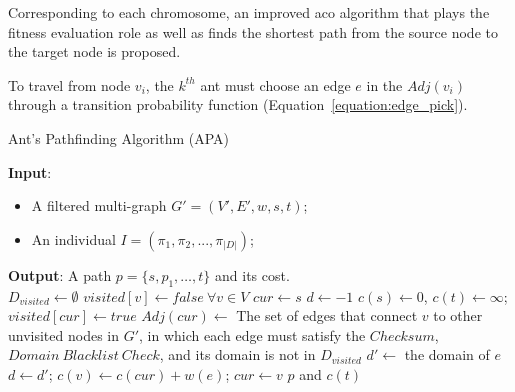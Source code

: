 Corresponding to each chromosome, an improved \gls{aco} algorithm that plays the fitness evaluation role as well as finds the shortest path from the source node to the target node is proposed. 

To travel from node $v_i$, the $k^{th}$ ant must choose an edge $e$ in the $Adj(v_i)$ through a transition probability function (Equation~\ref{equation:edge_pick}).

\begin{algorithm}
	\caption{Ant's Pathfinding Algorithm (APA)}
	\label{alg:apa}
	\textbf{Input}:	
	\begin{itemize}
		\item A filtered multi-graph $G' = (V', E', w, s, t)$;
		\item An individual $I = (\pi_1, \pi_2,...,\pi_{|D|})$;
	\end{itemize}
	\textbf{Output}: A path $p = \{s, p_1, \dots, t\}$ and its cost. \\
	\Begin
	{	
		$D_{visited} \leftarrow\emptyset$ \;
		$visited[v] \leftarrow false~\forall v \in V$ \;
		$cur \leftarrow s$ \;
		$d \leftarrow  -1$ \;
		$c(s) \leftarrow 0$, $c(t) \leftarrow \infty$;\\
		{
			$visited[cur] \leftarrow true$\;
			$Adj(cur) \leftarrow$ The set of edges that connect $v$ to other unvisited nodes in $G'$, in which each edge must satisfy the $Checksum$, $Domain~Blacklist~Check$, and its domain is not in $D_{visited}$\;
			$d' \leftarrow$ the domain of $e$\;
			$d \leftarrow d'$; $c(v) \leftarrow c(cur) + w(e)$;  $cur \leftarrow v$\; 
		}
		\Return $p$ and $c(t)$\;
	}
\end{algorithm}


